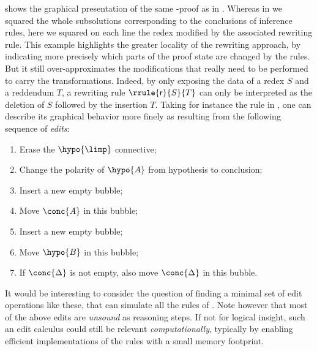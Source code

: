  shows the graphical presentation of the same -proof
as in . Whereas in  we squared the whole
subsolutions corresponding to the conclusions of inference rules, here we
squared on each line the redex modified by the associated rewriting rule. This
example highlights the greater locality of the rewriting approach, by indicating
more precisely which parts of the proof state are changed by the rules. But it
still over-approximates the modifications that really need to be performed to
carry the transformations. Indeed, by only exposing the data of a redex $S$ and
a reddendum $T$, a rewriting rule $\rrule{\mathsf{r}}{S}{T}$ can only be
interpreted as the deletion of $S$ followed by the insertion $T$. Taking for
instance the {\rnmsf{{\limp}{-}}} rule in , one can
describe its graphical behavior more finely as resulting from the following
sequence of \emph{edits}:
\begin{enumerate}
  \item Erase the $\hypo{{\limp}}$ connective;
  \item Change the polarity of $\hypo{A}$ from hypothesis to conclusion;
  \item Insert a new empty bubble;
  \item Move $\conc{A}$ in this bubble;
  \item Insert a new empty bubble;
  \item Move $\hypo{B}$ in this bubble;
  \item If $\conc{\Delta}$ is not empty, also move $\conc{\Delta}$ in this bubble.
\end{enumerate}
It would be interesting to consider the question of finding a minimal set of
edit operations like these, that can simulate all the rules of
. Note however that most of the above edits are
\emph{unsound} as reasoning steps. If not for logical insight, such an edit
calculus could still be relevant \emph{computationally}, typically by enabling
efficient implementations of the rules with a small memory footprint.

